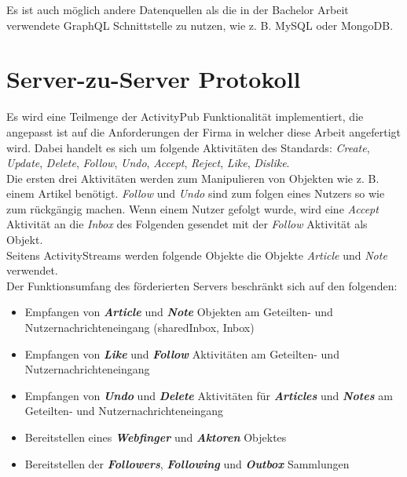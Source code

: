 Es ist auch möglich andere Datenquellen als die in der Bachelor Arbeit verwendete GraphQL Schnittstelle zu nutzen, wie z. B. MySQL oder MongoDB.\\

\section{Server-zu-Server Protokoll}
Es wird eine Teilmenge der ActivityPub Funktionalität implementiert, die angepasst ist auf die Anforderungen der Firma in welcher diese Arbeit angefertigt wird. Dabei handelt es sich um folgende Aktivitäten des Standards: \textit{Create}, \textit{Update}, \textit{Delete}, \textit{Follow}, \textit{Undo}, \textit{Accept}, \textit{Reject}, \textit{Like}, \textit{Dislike}.\\

Die ersten drei Aktivitäten werden zum Manipulieren von Objekten wie z. B. einem Artikel benötigt. \textit{Follow} und \textit{Undo} sind zum folgen eines Nutzers so wie zum rückgängig machen. Wenn einem Nutzer gefolgt wurde, wird eine \textit{Accept} Aktivität an die \textit{Inbox} des Folgenden gesendet mit der \textit{Follow} Aktivität als Objekt.\\

Seitens ActivityStreams werden folgende Objekte die Objekte \textit{Article} und \textit{Note} verwendet.\\

Der Funktionsumfang des förderierten Servers beschränkt sich auf den folgenden:
\begin{itemize}
	\item Empfangen von \textit{\textbf{Article}} und \textit{\textbf{Note}} Objekten am Geteilten- und Nutzernachrichteneingang (sharedInbox, Inbox)
	\item Empfangen von \textit{\textbf{Like}} und \textit{\textbf{Follow}} Aktivitäten am Geteilten- und Nutzernachrichteneingang 
	\item Empfangen von \textit{\textbf{Undo}} und \textit{\textbf{Delete}} Aktivitäten für \textit{\textbf{Articles}} und \textit{\textbf{Notes}} am Geteilten- und Nutzernachrichteneingang 
	\item Bereitstellen eines \textit{\textbf{Webfinger}} und \textit{\textbf{Aktoren}} Objektes
	\item Bereitstellen der \textit{\textbf{Followers}}, \textit{\textbf{Following}} und \textit{\textbf{Outbox}} Sammlungen
\end{itemize}

